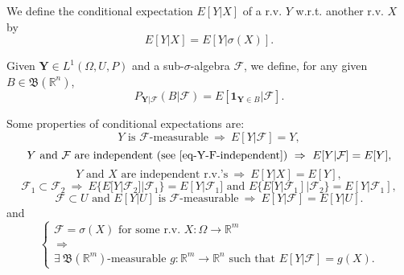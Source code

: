 We define the conditional expectation $E[Y|X]$ of a r.v. $Y$ w.r.t. another r.v. $X$ by
\begin{equation*}
E[Y|X] = E[Y|\sigma(X)].
\end{equation*}

Given $\mathbf{Y}\in L^1(\Omega,U,P)$ and
a sub-$\sigma$-algebra $\mathcal{F}$,
we define,
for any given $B\in\mathfrak{B}(\mathbb{R}^n)$,
\begin{equation}\label{eq-cond-prob-wrt-algebra}
P_{\mathbf{Y}|\mathcal{F}}(B|\mathcal{F}) = E[\mathbf{1}_{\mathbf{Y}\in B}|\mathcal{F}].
\end{equation}

Some properties of conditional expectations are:
\begin{equation}\label{eq-cond-expec-know-Y}
Y\text{ is }\mathcal{F}\text{-measurable}
~\Rightarrow~
E[Y|\mathcal{F}]=Y,
\end{equation}
\begin{equation}\label{eq-cond-expec-know-nothing}
Y\text{ and }\mathcal{F}\text{ are independent (see }\eqref{eq-Y-F-independent}\text{)}
~\Rightarrow~
E[Y|\mathcal{F}]=E[Y],
\end{equation}
\begin{equation}\label{eq-cond-expec-independent-rvs}
Y\text{ and }X\text{ are independent r.v.'s}
~\Rightarrow~
E[Y|X]=E[Y],
\end{equation}
\begin{equation}\label{eq-cond-expec-smaller-wins}
\mathcal{F}_1\subset\mathcal{F}_2
~\Rightarrow~
E\{E[Y|\mathcal{F}_2]|\mathcal{F}_1\} = E[Y|\mathcal{F}_1]\text{ and }E\{E[Y|\mathcal{F}_1]|\mathcal{F}_2\} = E[Y|\mathcal{F}_1],
\end{equation}
\begin{equation}\label{eq-cond-expec-f-u}
\mathcal{F}\subset U\text{ and }E[Y|U]\text{ is }\mathcal{F}\text{-measurable}
~\Rightarrow~
E[Y|\mathcal{F}] = E[Y|U].
\end{equation}
and
\begin{equation}\label{eq-cond-expec-exists-g}
\left\{
\begin{array}{c}
\mathcal{F}=\sigma(X)\text{ for some r.v. }X:\Omega\rightarrow\mathbb{R}^m \\
~\Rightarrow~ \\
\exists~\mathfrak{B}(\mathbb{R}^m)\text{-measurable }g:\mathbb{R}^m\rightarrow\mathbb{R}^n\text{ such that }E[Y|\mathcal{F}] = g(X).
\end{array}
\right.
\end{equation}

